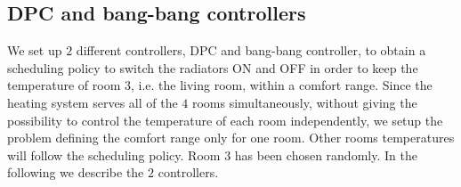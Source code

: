 %
%

\subsection{DPC and bang-bang controllers}
\label{SS:controllersDPCandBangbang}
We set up $2$ different controllers, DPC and bang-bang controller, to obtain a scheduling policy to switch the radiators ON and OFF in order to keep the temperature of room $3$, i.e. the living room, within a comfort range. Since the heating system serves all of the $4$ rooms simultaneously, without giving the possibility to control the temperature of each room independently, we setup the problem defining the comfort range only for one room. Other rooms temperatures will follow the scheduling policy. Room $3$ has been chosen randomly. In the following we describe the $2$ controllers.

